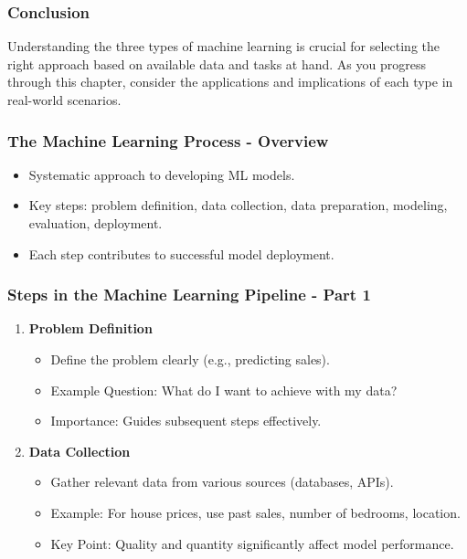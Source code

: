 \documentclass[aspectratio=169]{beamer}
\begin{document}
\begin{frame}[fragile]
    \frametitle{Conclusion}
    Understanding the three types of machine learning is crucial for selecting the right approach based on available data and tasks at hand. As you progress through this chapter, consider the applications and implications of each type in real-world scenarios.
\end{frame}

\begin{frame}[fragile]
    \frametitle{The Machine Learning Process - Overview}
    \begin{itemize}
        \item Systematic approach to developing ML models.
        \item Key steps: problem definition, data collection, data preparation, modeling, evaluation, deployment.
        \item Each step contributes to successful model deployment.
    \end{itemize}
\end{frame}

\begin{frame}[fragile]
    \frametitle{Steps in the Machine Learning Pipeline - Part 1}
    \begin{enumerate}
        \item \textbf{Problem Definition}
        \begin{itemize}
            \item Define the problem clearly (e.g., predicting sales).
            \item Example Question: What do I want to achieve with my data?
            \item Importance: Guides subsequent steps effectively.
        \end{itemize}
        
        \item \textbf{Data Collection}
        \begin{itemize}
            \item Gather relevant data from various sources (databases, APIs).
            \item Example: For house prices, use past sales, number of bedrooms, location.
            \item Key Point: Quality and quantity significantly affect model performance.
        \end{itemize}
    \end{enumerate}
\end{frame}
\end{document}
